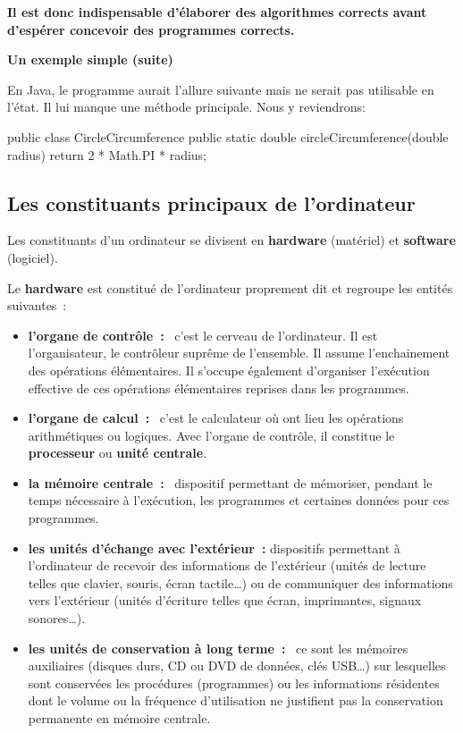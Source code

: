 			\textbf{%
			Il est donc indispensable d’élaborer des algorithmes corrects 
			avant d’espérer concevoir des programmes corrects.
			}

			\textbf{Un exemple simple (suite)}

			En Java, le programme aurait l'allure suivante mais ne serait pas
			utilisable en l'état. Il lui manque une méthode principale. Nous
			y reviendrons: 

			\begin{java}
public class CircleCircumference{
	public static double circleCircumference(double radius){
		return 2 * Math.PI * radius;
	}
}
			\end{java}

	
		\subsection{Les constituants principaux de l’ordinateur}
		
			Les constituants d’un ordinateur 
			se divisent en \textbf{hardware} (matériel) 
			et \textbf{software} (logiciel).
			
			Le \textbf{hardware} est constitué 
			de l’ordinateur proprement dit 
			et regroupe les entités suivantes~:
	
			\begin{itemize}
			\item
				\textbf{l’organe de contrôle~:}~
				c’est le cerveau de l’ordinateur. 
				Il est l’organisateur, 
				le contrôleur suprême de l’ensemble. 
				Il assume l’enchainement des opérations élémentaires. 
				Il s’occupe également d’organiser l’exécution effective
				de ces opérations élémentaires reprises dans les programmes.
			\item
				\textbf{l’organe de calcul~:}~
				c’est le calculateur 
				où ont lieu les opérations arithmétiques ou logiques. 
				Avec l’organe de contrôle, 
				il constitue le \textbf{processeur} 
				ou \textbf{unité centrale}.
			\item
				\textbf{la mémoire centrale~:}~
				dispositif permettant de mémoriser,
				pendant le temps nécessaire à l’exécution, 
				les programmes et certaines données pour ces programmes.
			\item
				\textbf{les unités d’échange avec l’extérieur~:} 
				dispositifs permettant à l’ordinateur de recevoir 
				des informations de l’extérieur 
				(unités de lecture telles que clavier, souris, écran tactile\dots) 
				ou de communiquer des informations vers l’extérieur 
				(unités d’écriture telles que écran, imprimantes, signaux sonores\dots).
			\item
				\textbf{les unités de conservation à long terme~:}~
				ce sont les mémoires auxiliaires 
				(disques durs, CD ou DVD de données, clés USB\dots) 
				sur lesquelles sont conservées les procédures (programmes) 
				ou les informations résidentes dont le volume 
				ou la fréquence d’utilisation ne justifient pas 
				la conservation permanente en mémoire centrale.
			\end{itemize}
			
